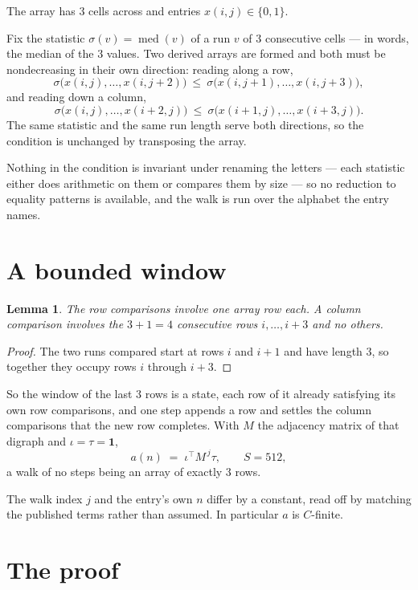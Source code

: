 \documentclass[11pt,a4paper]{article}
\theoremstyle{plain}
\newtheorem{lemma}[theorem]{Lemma}
\theoremstyle{definition}
\begin{document}
The array has $3$ cells across and entries $x(i,j)\in\{0,1\}$.

Fix the statistic $\sigma(v)=\operatorname{med}(v)$ of a run $v$ of $3$ consecutive cells --- in words,
the median of the $3$ values. Two derived arrays are formed and both must be
nondecreasing in their own direction: reading along a row,
\[
\sigma\bigl(x(i,j),\dots,x(i,j{+}2)\bigr)\ \le\
\sigma\bigl(x(i,j{+}1),\dots,x(i,j{+}3)\bigr),
\]
and reading down a column,
\[
\sigma\bigl(x(i,j),\dots,x(i{+}2,j)\bigr)\ \le\
\sigma\bigl(x(i{+}1,j),\dots,x(i{+}3,j)\bigr).
\]
The same statistic and the same run length serve both directions, so the condition is
unchanged by transposing the array.

Nothing in the condition is invariant under renaming the letters --- each statistic either does
arithmetic on them or compares them by size --- so no reduction to equality patterns is
available, and the walk is run over the alphabet the entry names.

\section{A bounded window}

\begin{lemma}\label{lem:win}
The row comparisons involve one array row each. A column comparison involves the
$3+1=4$ consecutive rows $i,\dots,i{+}3$ and no others.
\end{lemma}

\begin{proof}
The two runs compared start at rows $i$ and $i+1$ and have length $3$, so together they
occupy rows $i$ through $i+3$.
\end{proof}

So the window of the last $3$ rows is a state, each row of it already satisfying its own row
comparisons, and one step appends a row and settles the column comparisons that the new row
completes. With $M$ the adjacency matrix of that digraph and $\iota=\tau=\mathbf{1}$,
\[
a(n)\;=\;\iota^{\!\top}M^{\,j}\tau ,\qquad S=512,
\]
a walk of no steps being an array of exactly $3$ rows.

The walk index $j$ and the entry's own $n$ differ by a constant, read off by matching the
published terms rather than assumed. In particular $a$ is $C$-finite.

\section{The proof}
\end{document}
